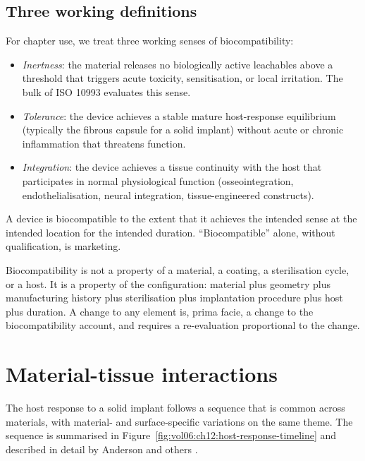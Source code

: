 \subsection{Three working definitions}

For chapter use, we treat three working senses of biocompatibility:

\begin{itemize}[leftmargin=*]
\item \emph{Inertness}: the material releases no biologically
  active leachables above a threshold that triggers acute toxicity,
  sensitisation, or local irritation. The bulk of ISO 10993
  evaluates this sense.
\item \emph{Tolerance}: the device achieves a stable mature
  host-response equilibrium (typically the fibrous capsule for a
  solid implant) without acute or chronic inflammation that
  threatens function.
\item \emph{Integration}: the device achieves a tissue continuity
  with the host that participates in normal physiological function
  (osseointegration, endothelialisation, neural integration,
  tissue-engineered constructs).
\end{itemize}

A device is biocompatible to the extent that it achieves the
intended sense at the intended location for the intended duration.
``Biocompatible'' alone, without qualification, is marketing.

\begin{principle}
Biocompatibility is not a property of a material, a coating, a
sterilisation cycle, or a host. It is a property of the
configuration: material plus geometry plus manufacturing history
plus sterilisation plus implantation procedure plus host plus
duration. A change to any element is, prima facie, a change to
the biocompatibility account, and requires a re-evaluation
proportional to the change.
\end{principle}

\section{Material-tissue interactions}

The host response to a solid implant follows a sequence that is
common across materials, with material- and surface-specific
variations on the same theme. The sequence is summarised in
Figure~\ref{fig:vol06:ch12:host-response-timeline} and described
in detail by Anderson and others
\cite{paper:v6c12-anderson-foreign-body-2008}.

